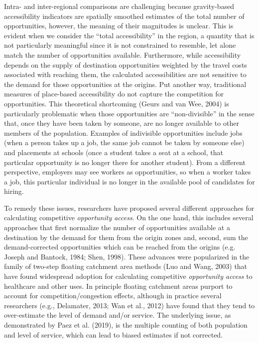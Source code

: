 \documentclass[]{elsarticle} %
\begin{document}
Intra- and inter-regional comparisons are challenging because
gravity-based accessibility indicators are spatially smoothed estimates
of the total number of opportunities, however, the meaning of their
magnitudes is unclear. This is evident when we consider the ``total
accessibility'' in the region, a quantity that is not particularly
meaningful since it is not constrained to resemble, let alone match the
number of opportunities available. Furthermore, while accessibility
depends on the supply of destination opportunities weighted by the
travel costs associated with reaching them, the calculated
accessibilities are not sensitive to the demand for those opportunities
at the origins. Put another way, traditional measures of place-based
accessibility do not capture the competition for opportunities. This
theoretical shortcoming (Geurs and van Wee, 2004) is particularly
problematic when those opportunities are ``non-divisible'' in the sense
that, once they have been taken by someone, are no longer available to
other members of the population. Examples of indivisible opportunities
include jobs (when a person takes up a job, the same job cannot be taken
by someone else) and placements at schools (once a student takes a seat
at a school, that particular opportunity is no longer there for another
student). From a different perspective, employers may see workers as
opportunities, so when a worker takes a job, this particular individual
is no longer in the available pool of candidates for hiring.

To remedy these issues, researchers have proposed several different
approaches for calculating competitive \emph{opportunity access}. On the
one hand, this includes several approaches that first normalize the
number of opportunities available at a destination by the demand for
them from the origin zones and, second, sum the demand-corrected
opportunities which can be reached from the origins (e.g. Joseph and
Bantock, 1984; Shen, 1998). These advances were popularized in the
family of two-step floating catchment area methods (Luo and Wang, 2003)
that have found widespread adoption for calculating competitive
\emph{opportunity access} to healthcare and other uses. In principle
floating catchment areas purport to account for competition/congestion
effects, although in practice several researchers (e.g., Delamater,
2013; Wan et al., 2012) have found that they tend to over-estimate the
level of demand and/or service. The underlying issue, as demonstrated by
Paez et al. (2019), is the multiple counting of both population and
level of service, which can lead to biased estimates if not corrected.
\end{document}
